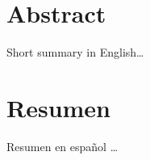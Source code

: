 \begingroup
\let\clearpage\relax
\let\cleardoublepage\relax
\let\cleardoublepage\relax

\chapter*{Abstract}
Short summary in English\dots

\lipsum[1]

\vfill

\chapter*{Resumen}
Resumen en español \dots

\lipsum[1]

\endgroup			

\vfill

